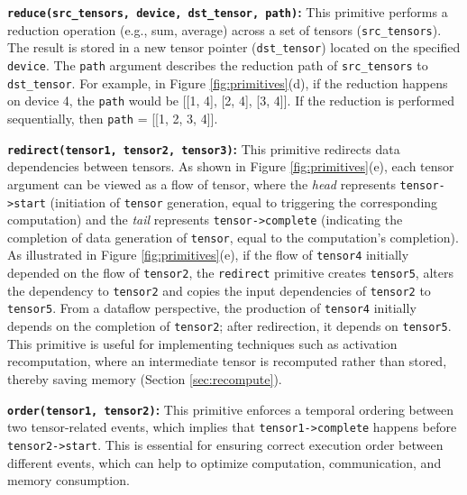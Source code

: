 
\textbf{\texttt{reduce(src\_tensors, device, dst\_tensor, path)}:} This primitive performs a reduction operation (e.g., sum, average) across a set of tensors (\texttt{src\_tensors}). The result is stored in a new tensor pointer (\texttt{dst\_tensor}) located on the specified \texttt{device}. The \texttt{path} argument describes the reduction path of \texttt{src\_tensors} to \texttt{dst\_tensor}. For example, in Figure \ref{fig:primitives}(d), if the reduction happens on device 4, the \texttt{path} would be [[1, 4], [2, 4], [3, 4]]. If the reduction is performed sequentially, then \texttt{path} = [[1, 2, 3, 4]].

\textbf{\texttt{redirect(tensor1, tensor2, tensor3)}:} This primitive redirects data dependencies between tensors. As shown in Figure \ref{fig:primitives}(e), each tensor argument can be viewed as a flow of tensor, where the \textit{head} represents \texttt{tensor->start} (initiation of \texttt{tensor} generation, equal to triggering the corresponding computation) and the \textit{tail} represents \texttt{tensor->complete} (indicating the completion of data generation of \texttt{tensor}, equal to the computation's completion). As illustrated in Figure \ref{fig:primitives}(e), if the flow of \texttt{tensor4} initially depended on the flow of \texttt{tensor2}, the \texttt{redirect} primitive creates \texttt{tensor5}, alters the dependency to \texttt{tensor2} and copies the input dependencies of \texttt{tensor2} to \texttt{tensor5}. From a dataflow perspective, the production of \texttt{tensor4} initially depends on the completion of \texttt{tensor2}; after redirection, it depends on \texttt{tensor5}. This primitive is useful for implementing techniques such as activation recomputation, where an intermediate tensor is recomputed rather than stored, thereby saving memory (Section \ref{sec:recompute}).

\textbf{\texttt{order(tensor1, tensor2)}:} This primitive enforces a temporal ordering between two tensor-related events, which implies that \texttt{tensor1->complete} happens before \texttt{tensor2->start}. This is essential for ensuring correct execution order between different events, which can help to optimize computation, communication, and memory consumption.

